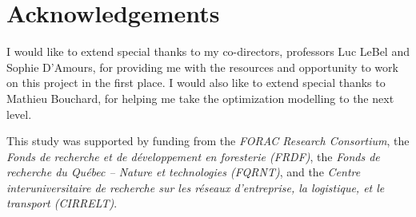 \chapter*{Acknowledgements}


I would like to extend special thanks to my co-directors, professors Luc LeBel and Sophie D'Amours, for providing me with the resources and opportunity to work on this project in the first place. I would also like to extend special thanks to Mathieu Bouchard, for helping me take the optimization modelling to the next level.

This study was supported by funding from the \emph{FORAC Research Consortium}, the \emph{Fonds de recherche et de développement en foresterie (FRDF)}, the \emph{Fonds de recherche du Qu\'{e}bec -- Nature et technologies (FQRNT)}, and the \emph{Centre interuniversitaire de recherche sur les réseaux d'entreprise, la logistique, et le transport (CIRRELT)}.

